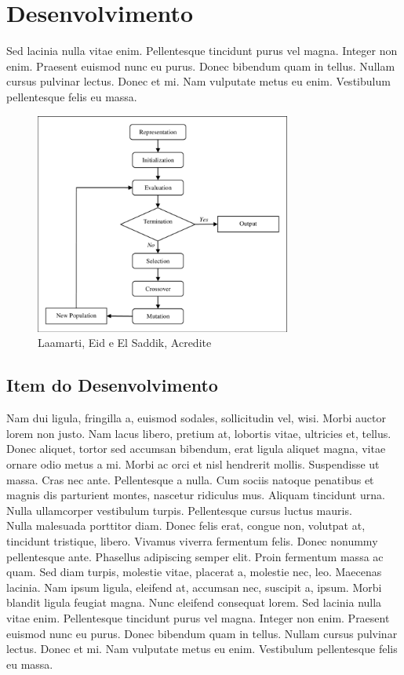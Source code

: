 \section{Desenvolvimento}

Sed lacinia nulla vitae enim. Pellentesque tincidunt purus vel magna.
Integer non enim. Praesent euismod nunc eu purus. Donec bibendum quam in tellus.
Nullam cursus pulvinar lectus. Donec et mi. Nam vulputate metus eu enim. Vestibulum
pellentesque felis eu massa. \\

\begin{figure}[h]
    \centering
    \includegraphics[width=0.75\textwidth]{images/Steps-of-Genetic-Algorithms.png}
    \caption{Laamarti, Eid e El Saddik, Acredite}
\end{figure}

\subsection{Item do Desenvolvimento}

Nam dui ligula, fringilla a, euismod sodales, sollicitudin vel, wisi. Morbi auctor lorem non
justo. Nam lacus libero, pretium at, lobortis vitae, ultricies et, tellus. Donec aliquet, tortor
sed accumsan bibendum, erat ligula aliquet magna, vitae ornare odio metus a mi. Morbi
ac orci et nisl hendrerit mollis. Suspendisse ut massa. Cras nec ante. Pellentesque a nulla.
Cum sociis natoque penatibus et magnis dis parturient montes, nascetur ridiculus mus.
Aliquam tincidunt urna. Nulla ullamcorper vestibulum turpis. Pellentesque cursus luctus
mauris. \\

Nulla malesuada porttitor diam. Donec felis erat, congue non, volutpat at, tincidunt
tristique, libero. Vivamus viverra fermentum felis. Donec nonummy pellentesque ante.
Phasellus adipiscing semper elit. Proin fermentum massa ac quam. Sed diam turpis,
molestie vitae, placerat a, molestie nec, leo. Maecenas lacinia. Nam ipsum ligula, eleifend
at, accumsan nec, suscipit a, ipsum. Morbi blandit ligula feugiat magna. Nunc eleifend
consequat lorem. Sed lacinia nulla vitae enim. Pellentesque tincidunt purus vel magna.
Integer non enim. Praesent euismod nunc eu purus. Donec bibendum quam in tellus.
Nullam cursus pulvinar lectus. Donec et mi. Nam vulputate metus eu enim. Vestibulum
pellentesque felis eu massa. \\

